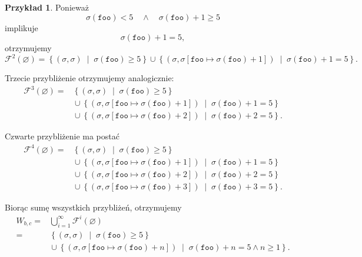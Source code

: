 \documentclass[11pt,a4paper]{article}
\theoremstyle{definition}
\newtheorem{przyklad}[definicja]{Przykład}
\theoremstyle{plain}
\begin{document}
\begin{przyklad}
	Ponieważ
	\[
	\sigma(\mathtt{foo})<5
	\quad\land\quad
	\sigma(\mathtt{foo})+1\geq5
	\]
	implikuje
	\[
	\sigma(\mathtt{foo})+1=5,
	\]
	otrzymujemy
	\[
	\mathcal{F}^2(\varnothing)
	=
	\left\{
	(\sigma,\sigma)
	\;\middle|\;
	\sigma(\mathtt{foo})\geq5
	\right\}
	\cup
	\left\{
	\left(
	\sigma,
	\sigma[\mathtt{foo}\mapsto\sigma(\mathtt{foo})+1]
	\right)
	\;\middle|\;
	\sigma(\mathtt{foo})+1=5
	\right\}.
	\]
	
	Trzecie przybliżenie otrzymujemy analogicznie:
	\[
	\begin{aligned}
		\mathcal{F}^3(\varnothing)
		={}&
		\left\{
		(\sigma,\sigma)
		\;\middle|\;
		\sigma(\mathtt{foo})\geq5
		\right\}\\
		&{}\cup
		\left\{
		\left(
		\sigma,
		\sigma[\mathtt{foo}\mapsto\sigma(\mathtt{foo})+1]
		\right)
		\;\middle|\;
		\sigma(\mathtt{foo})+1=5
		\right\}\\
		&{}\cup
		\left\{
		\left(
		\sigma,
		\sigma[\mathtt{foo}\mapsto\sigma(\mathtt{foo})+2]
		\right)
		\;\middle|\;
		\sigma(\mathtt{foo})+2=5
		\right\}.
	\end{aligned}
	\]
	
	Czwarte przybliżenie ma postać
	\[
	\begin{aligned}
		\mathcal{F}^4(\varnothing)
		={}&
		\left\{
		(\sigma,\sigma)
		\;\middle|\;
		\sigma(\mathtt{foo})\geq5
		\right\}\\
		&{}\cup
		\left\{
		\left(
		\sigma,
		\sigma[\mathtt{foo}\mapsto\sigma(\mathtt{foo})+1]
		\right)
		\;\middle|\;
		\sigma(\mathtt{foo})+1=5
		\right\}\\
		&{}\cup
		\left\{
		\left(
		\sigma,
		\sigma[\mathtt{foo}\mapsto\sigma(\mathtt{foo})+2]
		\right)
		\;\middle|\;
		\sigma(\mathtt{foo})+2=5
		\right\}\\
		&{}\cup
		\left\{
		\left(
		\sigma,
		\sigma[\mathtt{foo}\mapsto\sigma(\mathtt{foo})+3]
		\right)
		\;\middle|\;
		\sigma(\mathtt{foo})+3=5
		\right\}.
	\end{aligned}
	\]
	
	Biorąc sumę wszystkich przybliżeń, otrzymujemy
	\[
	\begin{aligned}
		W_{b,c}
		={}&
		\bigcup_{i=1}^{\infty}\mathcal{F}^i(\varnothing)\\
		={}&
		\left\{
		(\sigma,\sigma)
		\;\middle|\;
		\sigma(\mathtt{foo})\geq5
		\right\}\\
		&{}\cup
		\left\{
		\left(
		\sigma,
		\sigma[\mathtt{foo}\mapsto\sigma(\mathtt{foo})+n]
		\right)
		\;\middle|\;
		\sigma(\mathtt{foo})+n=5
		\land
		n\geq1
		\right\}.
	\end{aligned}
	\]
	

\end{przyklad}
\end{document}
